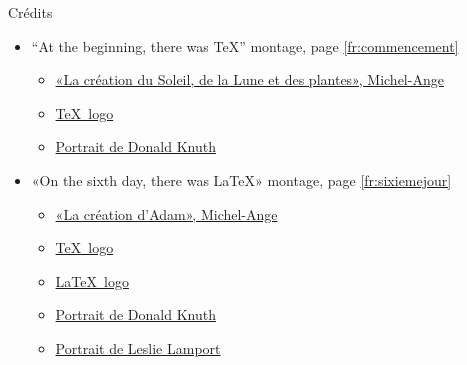 \begin{frame}{Crédits}
	\begin{itemize}
		\item ``At the beginning, there was \TeX'' montage, page \ref{fr:commencement}
		\begin{itemize}
			\scriptsize
			\item \href{https://en.wikipedia.org/wiki/The_Creation_of_the_Sun,_Moon_and_Vegetation}{«La création du Soleil, de la Lune et des plantes», Michel-Ange}
			\item \href{https://fr.m.wikipedia.org/wiki/TeX}{\TeX\ logo}
			\item \href{https://www-cs-faculty.stanford.edu/~knuth/}{Portrait de Donald Knuth}
		\end{itemize}
		\item «On the sixth day, there was \LaTeX » montage, page \ref{fr:sixiemejour}
		\begin{itemize}
			\scriptsize
			\item \href{https://en.wikipedia.org/wiki/The_Creation_of_Adam}{«La création d'Adam», Michel-Ange}
			\item \href{https://fr.m.wikipedia.org/wiki/TeX}{\TeX\ logo}
			\item \href{https://fr.m.wikipedia.org/wiki/LaTeX}{\LaTeX\ logo}
			\item \href{https://www-cs-faculty.stanford.edu/~knuth/}{Portrait de Donald Knuth}
			\item \href{https://en.wikipedia.org/wiki/Leslie_Lamport}{Portrait de Leslie Lamport}
		\end{itemize}
	\end{itemize}
\end{frame}